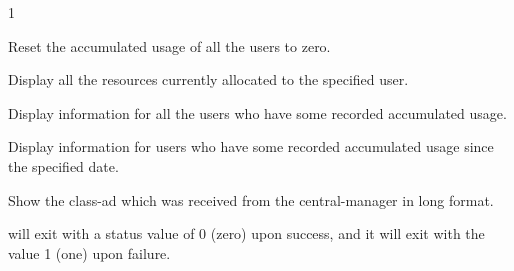 \begin{ManPage}{\label{man-condor-userprio}}{1}
\begin{Options}
	{Reset the accumulated usage of all the users to zero.}

	{Display all the resources currently allocated to the specified user.}

	{Display information for all the users who have some recorded accumulated usage.}

	{Display information for users who have some recorded accumulated usage since
the specified date.}

	{Show the class-ad which was received from the central-manager in long format.}

\end{Options}

\ExitStatus

 will exit with a status value of 0 (zero) upon success,
and it will exit with the value 1 (one) upon failure.

\end{ManPage}
